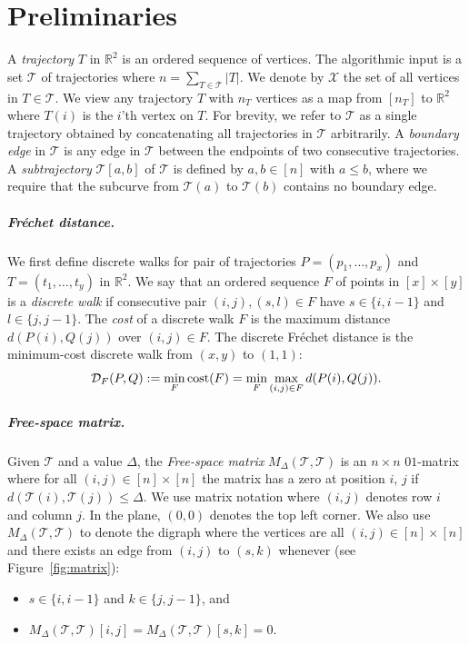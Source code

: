\documentclass[11pt]{article}
\newcommand{\frechet}{Fr\'{e}chet\xspace}
\newcommand{\fd}{\mathcal{D}_F}
\begin{document}
\section{Preliminaries}
%
A \emph{trajectory} $T$ in $\mathbb{R}^2$ is an ordered sequence of vertices.  
The algorithmic input is a set $\mathcal{T}$ of trajectories where $n = \sum_{T \in \mathcal{T}} |T|$. 
We denote by $\mathcal{X}$ the set of all vertices in $T \in \mathcal{T}$. 
We view any trajectory $T$ with $n_T$ vertices as a map from $[n_T]$ to $\mathbb{R}^2$ where $T(i)$ is the $i$'th vertex on $T$. 
For brevity, we refer to $\mathcal{T}$ as a single trajectory obtained by concatenating all trajectories in $\mathcal{T}$ arbitrarily.
 A \emph{boundary edge} in $\mathcal{T}$ is any edge in $\mathcal{T}$ between the endpoints of two consecutive trajectories.
A \emph{subtrajectory} $\mathcal{T}[a, b]$ of $\mathcal{T}$ is defined by $a, b \in [n]$ with $a \leq b$, where we require that the subcurve from $\mathcal{T}(a)$ to $\mathcal{T}(b)$ contains no boundary edge. 
%
%
%
\subparagraph{\frechet distance.}
We first define discrete walks for pair of trajectories $P = (p_1, \ldots, p_x)$ and $T = (t_1, \ldots, t_y)$ in $\mathbb{R}^2$.
We say that an ordered sequence $F$ of points in $[x] \times [y]$ is a \emph{discrete walk} if consecutive pair $(i, j), (s, l) \in F$ have $s\in \{i,i-1\}$ and $l\in\{j,j-1\}$.
The \emph{cost} of a discrete walk $F$ is the maximum distance $d(P(i), Q(j))$ over $(i, j) \in F$.
The discrete \frechet distance is the minimum-cost discrete walk from $(x, y)$ to $(1, 1)$:
\[
\fd(P, Q) := \min_{F }  \textnormal{cost}(F) = \min_{F } \max_{(i, j) \in F} d(P(i), Q(j)).
\]
%
\subparagraph{Free-space matrix.}
Given $\mathcal{T}$ and  a value $\Delta$, the \emph{Free-space matrix} $M_\Delta(\mathcal{T}, \mathcal{T})$ is an $n \times n$ $01$-matrix where for all $(i, j) \in [n] \times [n]$ the matrix has a zero at position $i$, $j$ if $d(\mathcal{T}(i), \mathcal{T}(j)) \leq \Delta$.  We use matrix notation where $(i, j)$ denotes row $i$ and column $j$.
In the plane, $(0, 0)$ denotes the top left corner.
We also use $M_\Delta(\mathcal{T}, \mathcal{T})$ to denote the digraph where the vertices are all $(i, j) \in [n] \times [n]$ and there exists an edge from $(i, j)$ to $(s, k)$ whenever (see Figure~\ref{fig:matrix}):
\begin{itemize}
    \item $s \in \{ i, i -1 \}$ and $k \in \{ j, j - 1 \}$, and
    \item  $M_\Delta(\mathcal{T}, \mathcal{T})[i, j] = M_\Delta(\mathcal{T}, \mathcal{T})[s, k] = 0$.
\end{itemize}
\end{document}
